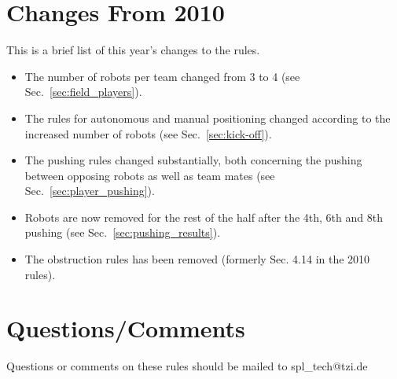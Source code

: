 \documentclass[12pt]{article}
\begin{document}
\section{Changes From 2010}

This is a brief list of this year's changes to the rules.

\begin{itemize}
\item The number of robots per team changed from 3 to 4 (see Sec.~\ref{sec:field_players}).
\item The rules for autonomous and manual positioning changed according to the increased number of robots (see Sec.~\ref{sec:kick-off}).
\item The pushing rules changed substantially, both concerning the pushing between opposing robots as well as team mates (see Sec.~\ref{sec:player_pushing}).
\item Robots are now removed for the rest of the half after the 4th, 6th and 8th pushing (see Sec.~\ref{sec:pushing_results}).
\item The obstruction rules has been removed (formerly Sec. 4.14 in the 2010 rules).

\end{itemize}


\section{Questions/Comments}

Questions or comments on these rules should be mailed to spl\_tech@tzi.de
\end{document}
